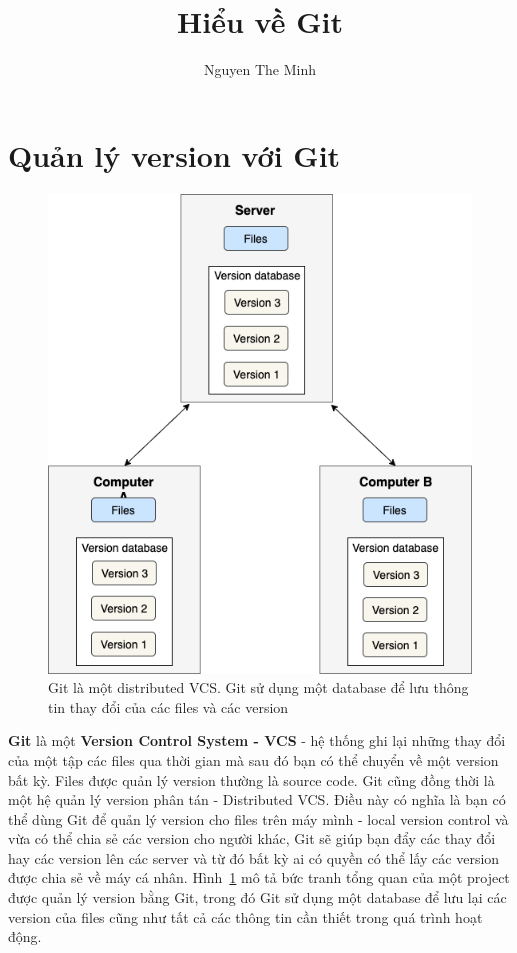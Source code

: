 \documentclass[a4paper, 11pt]{article}
\author{Nguyen The Minh}
\title{Hiểu về Git}
\begin{document}
\maketitle
\tableofcontents
\newpage

\section{Quản lý version với Git} \label{introduction}

\begin{figure}
\centering
\includegraphics[scale=0.6]{git-overview.png}
\caption{Git là một distributed VCS. Git sử dụng một database để lưu thông tin thay đổi của các files và các version}
\label{fig:git-overview}
\end{figure}

\textbf{Git} là một \textbf{Version Control System - VCS} - hệ thống ghi lại những thay đổi của một tập các files qua thời gian mà sau đó bạn có thể chuyển về một version bất kỳ. Files được quản lý version thường là source code. Git cũng đồng thời là một hệ quản lý version phân tán - Distributed VCS. Điều này có nghĩa là bạn có thể dùng Git để quản lý version cho files trên máy mình - local version control và vừa có thể chia sẻ các version cho người khác, Git sẽ giúp bạn đẩy các thay đổi hay các version lên các server và từ đó bất kỳ ai có quyền có thể lấy các version được chia sẻ về máy cá nhân. Hình~\ref{fig:git-overview} mô tả bức tranh tổng quan của một project được quản lý version bằng Git, trong đó Git sử dụng một database để lưu lại các version của files cũng như tất cả các thông tin cần thiết trong quá trình hoạt động.
\end{document}
